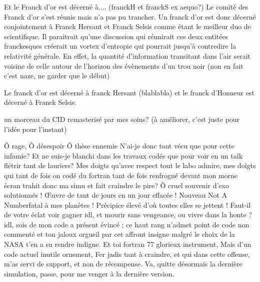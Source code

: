 Et le Franck d'or est décerné à.... (franckH et franckS ex aequo?)
Le comité des Franck d'or s'est réunis mais n'a pas pu trancher. Un franck d'or est donc décerné conjointement à Franck Hersant et Franck Selsis comme étant le meilleur duo de scientifique. Il paraitrait qu'une discussion qui réunirait ces deux entitées franckesques créerait un vortex d'entropie qui pourrait jusqu'à contredire la relativité générale. En effet, la quantité d'information transitant dans l'air serait voisine de celle autour de l'horizon des évènements d'un trou noir (non en fait c'est naze, ne garder que le début)

Le franck d'or est décerné à franck Hersant (blablabla) et le franck d'Honneur est décerné à Franck Selsis.

un morceau du CID remasterisé par mes soins? (à améliorer, c'est juste pour l'idée pour l'instant)


Ô rage, Ô désespoir Ô thèse ennemie
N'ai-je donc tant vécu que pour cette infamie?
Et ne suis-je blanchi dans les travaux codés
que pour voir en un talk flétrir tant de lauriers? 
Mes doigts qu'avec respect tout le labo admire, 
mes doigts qui tant de fois on codé du fortran
tant de fois renfrogné devant mon morne écran
trahit donc ma simu et fait craindre le pire? 
Ô cruel souvenir d'exo solutionnés !
Œuvre de tant de jours en un jour effacée !
Nouveau \og Not A Number\fg fatal à mes planètes !
Précipice élevé d'où toutes elles se jettent !
Faut-il de votre éclat voir gagner idl, 
et mourir sans vengeance, ou vivre dans la honte ? 
idl, sois de mon code a présent évincé ; 
ce haut rang n'admet point de code non commenté
et ton jaloux orgueil par cet affront insigne
malgré le choix de la NASA t'en a su rendre indigne. 
Et toi fortran 77 glorieux instrument, 
Mais d'un code actuel inutile ornement, 
Fer jadis tant à craindre, et qui dans cette offense, 
m'as servi de support, et non de récompense. 
Va, quitte désormais la dernière simulation,
passe, pour me venger à la dernière version.